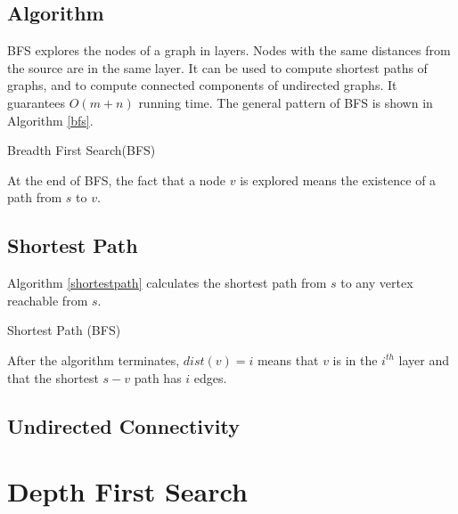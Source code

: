 \subsection{Algorithm}
BFS explores the nodes of a graph in layers. Nodes with the same distances from the source are in the same layer. It can be used to compute shortest paths of graphs, and to compute connected components of undirected graphs. It guarantees $O(m+n)$ running time. The general pattern of BFS is shown in Algorithm \ref{bfs}.
\begin{algorithm}[ht]
\caption{Breadth First Search(BFS)}\label{bfs}
\begin{algorithmic}[1]
\Input{}
\Output{}
\EndIf
\EndFor
\EndWhile 
\end{algorithmic}
\end{algorithm}

At the end of BFS, the fact that a node $v$ is explored means the existence of a path from $s$ to $v$. 
\subsection{Shortest Path}
Algorithm \ref{shortestpath} calculates the shortest path from $s$ to any vertex reachable from $s$.
\begin{algorithm}[ht]
\caption{Shortest Path (BFS)}\label{shortestpath}
\begin{algorithmic}[1]
\Input{}
\Output{}
\EndIf
\EndFor
\EndWhile 
\end{algorithmic}
\end{algorithm}

After the algorithm terminates, $dist(v)=i$ means that $v$ is in the $i^{th}$ layer and that the shortest $s-v$ path has $i$ edges.
\subsection{Undirected Connectivity}
\section{Depth First Search}
\ifx\PREAMBLE\undefined

\fi